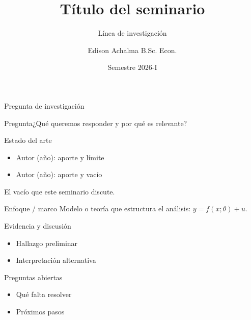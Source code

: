 \documentclass{academic-beamer}
\title{Título del seminario}
\subtitle{Línea de investigación}
\author{Edison Achalma B.Sc. Econ.}
\institute{Universidad Nacional de San Cristóbal de Huamanga}
\date{Semestre 2026-I}
\begin{document}
\begin{frame}\titlepage\end{frame}

\begin{frame}{Pregunta de investigación}
\begin{block}{Pregunta}¿Qué queremos responder y por qué es relevante?\end{block}
\end{frame}

\begin{frame}{Estado del arte}
\begin{itemize}\item Autor (año): aporte y límite \item Autor (año): aporte y vacío\end{itemize}
\begin{nota}El vacío que este seminario discute.\end{nota}
\end{frame}

\begin{frame}{Enfoque / marco}
Modelo o teoría que estructura el análisis: $y = f(x;\theta) + u$.
\end{frame}

\begin{frame}{Evidencia y discusión}
\begin{itemize}\item Hallazgo preliminar \item Interpretación alternativa\end{itemize}
\end{frame}

\begin{frame}{Preguntas abiertas}
\begin{itemize}\item Qué falta resolver \item Próximos pasos\end{itemize}
\vfill{}
\end{frame}
\end{document}
